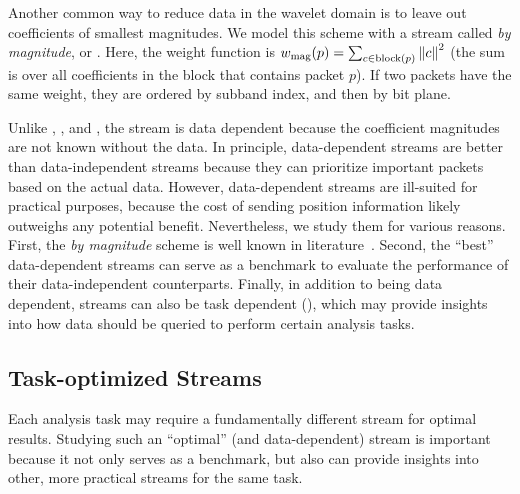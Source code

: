 Another common way to reduce data in the wavelet domain is to leave out coefficients of smallest
magnitudes.
 We model this scheme with a stream called \emph{by magnitude}, or \smag. Here, the
weight function is $\wmag(p)=\sum_{c\in \text{block}(p)}\norm{c}^2$ (the sum is over all
coefficients in the block that contains packet $p$). If two packets have the same weight, they are
ordered by subband index, and then by bit plane. 

Unlike \slvl, \sbit, and \swav, the \smag stream is
data dependent because the coefficient magnitudes are not known without the data.
%
In principle, data-dependent streams are better than data-independent streams because they can
prioritize important packets based on the actual data. However, data-dependent streams are
ill-suited for practical purposes, because the cost of sending position information likely outweighs
any potential benefit. Nevertheless, we study them for various reasons. First, the \emph{by
magnitude} scheme is well known in literature~\cite{vapor2007}. Second, the ``best'' data-dependent streams 
can
serve as a benchmark to evaluate the performance of their data-independent counterparts. Finally, in
addition to being data dependent, streams can also be task dependent (),
which may provide insights into how data should be queried to perform certain analysis tasks.

\subsection{Task-optimized Streams} \label{sec:data_dep_streams}

Each analysis task may require a fundamentally different stream for optimal results. Studying such
an ``optimal'' (and data-dependent) stream is important because it not only serves as a benchmark,
but also can provide insights into other, more practical streams for the same task.

